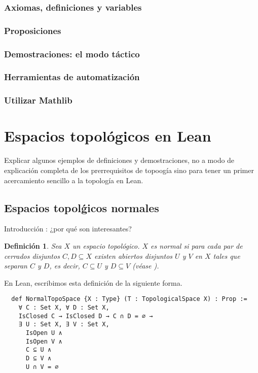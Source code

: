 \documentclass{article}
\newtheorem{definition}{Definición}[section]
\begin{document}
\subsubsection{Axiomas, definiciones y variables}

\subsubsection{Proposiciones}

\subsubsection{Demostraciones: el modo táctico}

\subsubsection{Herramientas de automatización}

\subsubsection{Utilizar Mathlib}


\section{Espacios topológicos en Lean}

Explicar algunos ejemplos de definiciones y demostraciones, no a modo de explicación completa de los prerrequisitos de topoogía sino para tener un primer acercamiento sencillo a la topología en Lean.

\subsection{Espacios topolǵicos normales}

Introducción : ¿por qué son interesantes?

\begin{definition}
  Sea $X$ un espacio topológico. $X$ es \emph{normal} si para cada par de cerrados disjuntos $C, D \subseteq X$ existen abiertos disjuntos $U$ y $V$ en $X$ tales  que separan $C$ y $D$, es decir, $C \subseteq U$ y $D \subseteq V$ \textnormal{(véase \cite[p. 99]{willard2012general})}.
\end{definition}

En Lean, escribimos esta definición de la siguiente forma.

\begin{lstlisting}
  def NormalTopoSpace {X : Type} (T : TopologicalSpace X) : Prop :=
    ∀ C : Set X, ∀ D : Set X,
    IsClosed C → IsClosed D → C ∩ D = ∅ →
    ∃ U : Set X, ∃ V : Set X,
      IsOpen U ∧
      IsOpen V ∧
      C ⊆ U ∧
      D ⊆ V ∧
      U ∩ V = ∅
\end{lstlisting}
\end{document}
